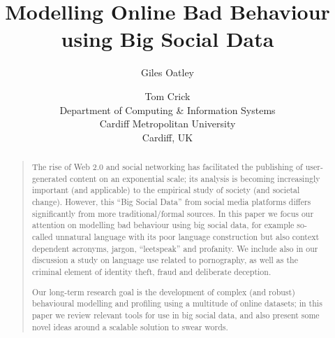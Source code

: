 \documentclass[letterpaper]{article}
\begin{document}
\title{Modelling Online Bad Behaviour using Big Social Data}
\author{Giles Oatley \and Tom Crick\\
Department of Computing \& Information Systems\\
Cardiff Metropolitan University\\
Cardiff, UK
}

\maketitle

\begin{abstract}
\begin{quote}
The rise of Web 2.0 and social networking has facilitated the
publishing of user-generated content on an exponential scale; its
analysis is becoming increasingly important (and applicable) to the
empirical study of society (and societal change). However, this ``Big
Social Data'' from social media platforms differs significantly from
more traditional/formal sources.  In this paper we focus our attention
on modelling bad behaviour using big social data, for example
so-called unnatural language with its poor language construction but
also context dependent acronyms, jargon, ``leetspeak'' and
profanity. We include also in our discussion a study on language use
related to pornography, as well as the criminal element of identity
theft, fraud and deliberate deception.

Our long-term research goal is the development of complex (and robust)
behavioural modelling and profiling using a multitude of online
datasets; in this paper we review relevant tools for use in big social
data, and also present some novel ideas around a scalable solution to
swear words.
\end{quote}
\end{abstract}




\end{document}
